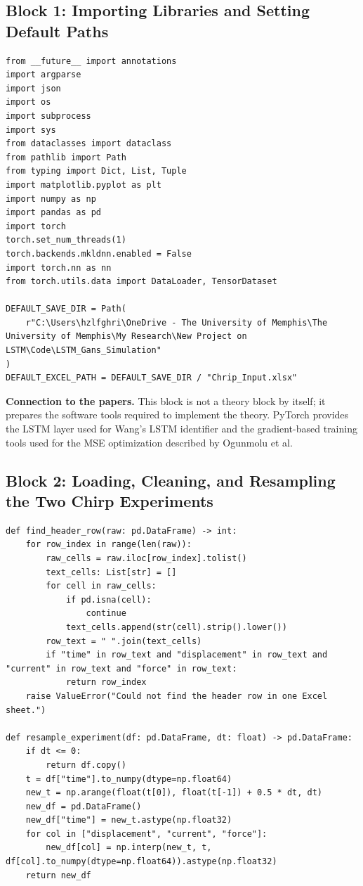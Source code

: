 \documentclass[11pt]{article}
\begin{document}
\subsection{Block 1: Importing Libraries and Setting Default Paths}
\begin{lstlisting}[style=pythonstyle]
from __future__ import annotations
import argparse
import json
import os
import subprocess
import sys
from dataclasses import dataclass
from pathlib import Path
from typing import Dict, List, Tuple
import matplotlib.pyplot as plt
import numpy as np
import pandas as pd
import torch
torch.set_num_threads(1)
torch.backends.mkldnn.enabled = False
import torch.nn as nn
from torch.utils.data import DataLoader, TensorDataset

DEFAULT_SAVE_DIR = Path(
    r"C:\Users\hzlfghri\OneDrive - The University of Memphis\The University of Memphis\My Research\New Project on LSTM\Code\LSTM_Gans_Simulation"
)
DEFAULT_EXCEL_PATH = DEFAULT_SAVE_DIR / "Chrip_Input.xlsx"
\end{lstlisting}

\noindent\textbf{Connection to the papers.}
This block is not a theory block by itself; it prepares the software tools required to implement the theory. PyTorch provides the LSTM layer used for Wang's LSTM identifier and the gradient-based training tools used for the MSE optimization described by Ogunmolu et al.

\subsection{Block 2: Loading, Cleaning, and Resampling the Two Chirp Experiments}
\begin{lstlisting}[style=pythonstyle]
def find_header_row(raw: pd.DataFrame) -> int:
    for row_index in range(len(raw)):
        raw_cells = raw.iloc[row_index].tolist()
        text_cells: List[str] = []
        for cell in raw_cells:
            if pd.isna(cell):
                continue
            text_cells.append(str(cell).strip().lower())
        row_text = " ".join(text_cells)
        if "time" in row_text and "displacement" in row_text and "current" in row_text and "force" in row_text:
            return row_index
    raise ValueError("Could not find the header row in one Excel sheet.")

def resample_experiment(df: pd.DataFrame, dt: float) -> pd.DataFrame:
    if dt <= 0:
        return df.copy()
    t = df["time"].to_numpy(dtype=np.float64)
    new_t = np.arange(float(t[0]), float(t[-1]) + 0.5 * dt, dt)
    new_df = pd.DataFrame()
    new_df["time"] = new_t.astype(np.float32)
    for col in ["displacement", "current", "force"]:
        new_df[col] = np.interp(new_t, t, df[col].to_numpy(dtype=np.float64)).astype(np.float32)
    return new_df
\end{lstlisting}
\end{document}
